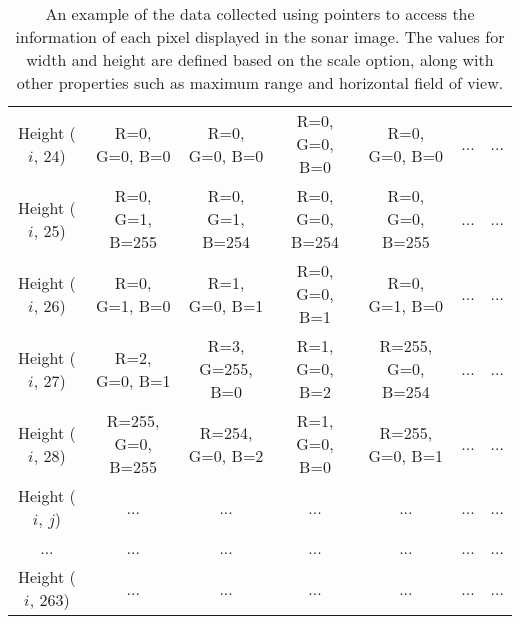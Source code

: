 \documentclass[]{article}
\begin{document}
\begin{table}[H]
\begin{center}
\begin{tabular}{ccccccc}
    			\footnotesize Height ($i$, 24) & \scriptsize R=0, G=0, B=0 & \scriptsize R=0, G=0, B=0 & \scriptsize R=0, G=0, B=0 & \scriptsize R=0, G=0, B=0 & ... & ...\\
    			
    			\footnotesize Height ($i$, 25) & \scriptsize R=0, G=1, B=255 & \scriptsize R=0, G=1, B=254 & \scriptsize R=0, G=0, B=254 & \scriptsize R=0, G=0, B=255 & ... & ...\\
    			
    			\footnotesize Height ($i$, 26) & \scriptsize R=0, G=1, B=0 & \scriptsize R=1, G=0, B=1 & \scriptsize R=0, G=0, B=1 & \scriptsize R=0, G=1, B=0 & ... & ...\\
    			
    			\footnotesize Height ($i$, 27) & \scriptsize R=2, G=0, B=1 & \scriptsize R=3, G=255, B=0 & \scriptsize R=1, G=0, B=2 & \scriptsize R=255, G=0, B=254 & ... & ...\\
    			
    			\footnotesize Height ($i$, 28) & \scriptsize R=255, G=0, B=255 & \scriptsize R=254, G=0, B=2 & \scriptsize R=1, G=0, B=0 & \scriptsize R=255, G=0, B=1 & ... & ...\\
    			
    			
    			\footnotesize Height ($i$, $j$) &  ... &  ... & ... &  ... & ...& ... \\
    			
    			...  & ... & ... & ... & ... & ...& ...\\
    			
    			\footnotesize Height ($i$, $263$) & ... & ... & ... & ... & ... & ...\\
    									
    			
    			\bottomrule\end{tabular}
    		\caption{An example of the data collected using pointers to access the information of each pixel displayed in the sonar image. The values for width and height are defined based on the scale option, along with other properties such as maximum range and horizontal field of view.}
    	\end{center}
    \end{table}

	

	\newpage
	
\end{document}
